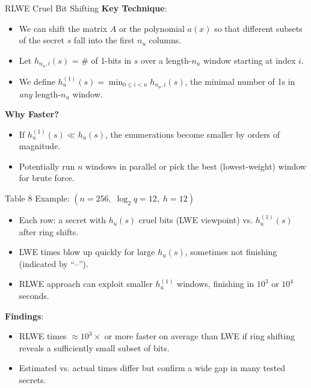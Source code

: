 \documentclass{beamer}
\begin{document}
\begin{frame}{RLWE Cruel Bit Shifting}
  \textbf{Key Technique}:
  \begin{itemize}
    \item We can shift the matrix $A$ or the polynomial $a(x)$ so that different subsets of the secret $s$ fall into the first $n_u$ columns.
    \item Let $h_{n_u,i}(s)$ = \# of 1-bits in $s$ over a length-$n_u$ window starting at index $i$.
    \item We define $h_u^{(1)}(s) = \min_{0\le i<n}h_{n_u,i}(s)$, the minimal number of 1s in \emph{any} length-$n_u$ window.
  \end{itemize}

  \vspace{0.2cm}
  \textbf{Why Faster?}
  \begin{itemize}
    \item If $h_u^{(1)}(s) \ll h_u(s)$, the enumerations become smaller by orders of magnitude.
    \item Potentially run $n$ windows in parallel or pick the best (lowest-weight) window for brute force.
  \end{itemize}
\end{frame}

\begin{frame}{Table 8 Example: $(n=256,\;\log_2 q=12,\;h=12)$}
  \footnotesize
  \begin{itemize}
    \item Each row: a secret with $h_u(s)$ cruel bits (LWE viewpoint) vs. $h_u^{(1)}(s)$ after ring shifts.
    \item LWE times blow up quickly for large $h_u(s)$, sometimes not finishing (indicated by ``--'').
    \item RLWE approach can exploit smaller $h_u^{(1)}$ windows, finishing in $10^3$ or $10^4$ seconds.
  \end{itemize}

  \vspace{0.2cm}
  \textbf{Findings}:
  \begin{itemize}
    \item RLWE times $\approx 10^3\times$ or more faster on average than LWE if ring shifting reveals a sufficiently small subset of bits.
    \item Estimated vs. actual times differ but confirm a wide gap in many tested secrets.
  \end{itemize}
\end{frame}
\end{document}
